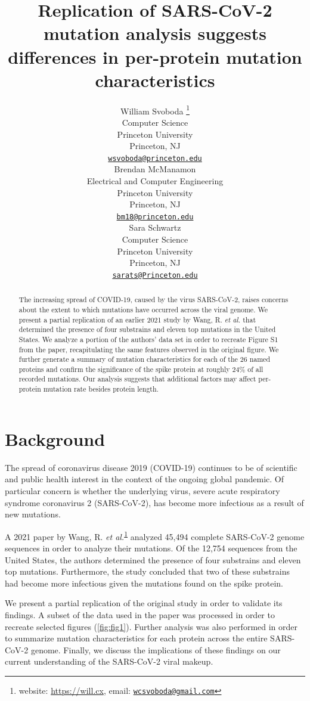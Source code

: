 \documentclass{article}
\title{Replication of SARS-CoV-2 mutation analysis suggests differences
in per-protein mutation characteristics}
\author{
    William Svoboda
    \thanks{website: \url{https://will.cx}, email:
\href{mailto:wcsvoboda@gmail.com}{\nolinkurl{wcsvoboda@gmail.com}}}
   \\
    Computer Science \\
    Princeton University \\
  Princeton, NJ \\
  \texttt{\href{mailto:wsvoboda@princeton.edu}{\nolinkurl{wsvoboda@princeton.edu}}} \\
   \And
    Brendan McManamon
   \\
    Electrical and Computer Engineering \\
    Princeton University \\
  Princeton, NJ \\
  \texttt{\href{mailto:bm18@princeton.edu}{\nolinkurl{bm18@princeton.edu}}} \\
   \And
    Sara Schwartz
   \\
    Computer Science \\
    Princeton University \\
  Princeton, NJ \\
  \texttt{\href{mailto:sarats@Princeton.edu}{\nolinkurl{sarats@Princeton.edu}}} \\
  }
\begin{document}
\maketitle

\def\tightlist{}


\begin{abstract}
The increasing spread of COVID-19, caused by the virus SARS-CoV-2,
raises concerns about the extent to which mutations have occurred across
the viral genome. We present a partial replication of an earlier 2021
study by Wang, R. \emph{et al.} that determined the presence of four
substrains and eleven top mutations in the United States. We analyze a
portion of the authors' data set in order to recreate Figure S1 from the
paper, recapitulating the same features observed in the original figure.
We further generate a summary of mutation characteristics for each of
the 26 named proteins and confirm the significance of the spike protein
at roughly 24\% of all recorded mutations. Our analysis suggests that
additional factors may affect per-protein mutation rate besides protein
length.
\end{abstract}


\hypersetup{urlcolor=blue}

\hypertarget{background}{%
\section{Background}\label{background}}

The spread of coronavirus disease 2019 (COVID-19) continues to be of
scientific and public health interest in the context of the ongoing
global pandemic. Of particular concern is whether the underlying virus,
severe acute respiratory syndrome coronavirus 2 (SARS-CoV-2), has become
more infectious as a result of new mutations.

A 2021 paper by Wang, R. \emph{et
al.}\textsuperscript{\protect\hyperlink{ref-Wang2021}{1}} analyzed
45,494 complete SARS-CoV-2 genome sequences in order to analyze their
mutations. Of the 12,754 sequences from the United States, the authors
determined the presence of four substrains and eleven top mutations.
Furthermore, the study concluded that two of these substrains had become
more infectious given the mutations found on the spike protein.

We present a partial replication of the original study in order to
validate its findings. A subset of the data used in the paper was
processed in order to recreate selected figures (\autoref{fig:fig1}).
Further analysis was also performed in order to summarize mutation
characteristics for each protein across the entire SARS-CoV-2 genome.
Finally, we discuss the implications of these findings on our current
understanding of the SARS-CoV-2 viral makeup.
\end{document}
